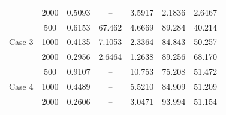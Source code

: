 \begin{table}[tb]
\begin{tabular}{cc| ccccc}
    &2000 &  0.5093  &  --  &  3.5917  &  2.1836 & 2.6467 \\
    \multirow{3}{*}{Case 3}
    & 500 &  0.6153  &  67.462  &  4.6669  &  89.284 & 40.214 \\
    &1000 &  0.4135  &  7.1053  &  2.3364  &  84.843 & 50.257 \\
    &2000 &  0.2956 &  2.6464   &  1.2638  &  89.256  &  68.170\\
    \multirow{3}{*}{Case 4}
    & 500 &  0.9107  &  --  &  10.753   &  75.208 & 51.472 \\
    &1000 &  0.4489  &  --  &  5.5210  & 84.909  & 51.209 \\
    &2000 &  0.2606  &  --  &  3.0471  & 93.994  & 51.154 \\
         \bottomrule[1pt]
	\end{tabular}
  \end{table}
  
